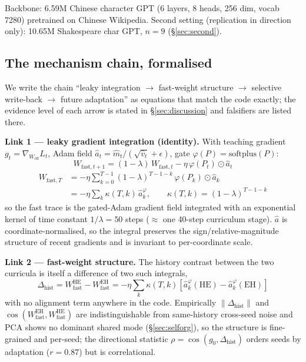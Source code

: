 \documentclass{article} %
\begin{document}
Backbone: 6.59M Chinese character GPT (6 layers, 8 heads, 256 dim, vocab 7280) pretrained on Chinese Wikipedia. Second setting (replication in direction only): 10.65M Shakespeare char GPT, $n{=}9$ (\S\ref{sec:second}).

\subsection{The mechanism chain, formalised}
\label{sec:chain}

We write the chain ``leaky integration $\to$ fast-weight structure $\to$ selective write-back $\to$ future adaptation'' as equations that match the code exactly; the evidence level of each arrow is stated in \S\ref{sec:discussion} and falsifiers are listed there.

\textbf{Link 1 --- leaky gradient integration (identity).} With teaching gradient $g_t = \nabla_{W_{\mathrm{eff}}} L_t$, Adam field $\hat{a}_t = \hat{m}_t/(\sqrt{\hat{v}_t}+\epsilon)$, gate $\varphi(P)=\mathrm{softplus}(P)$:
\begin{equation}
W_{\mathrm{fast},t+1} = (1-\lambda)\,W_{\mathrm{fast},t} - \eta\,\varphi(P_t)\odot \hat{a}_t
\end{equation}
\begin{equation}
\begin{aligned}
W_{\mathrm{fast},T} &= -\eta \sum_{k=0}^{T-1}(1-\lambda)^{T-1-k}\,\varphi(P_k)\odot \hat{a}_k \\
&= -\eta \sum_{k} \kappa(T,k)\,\hat{a}^{\varphi}_k,\qquad \kappa(T,k)=(1-\lambda)^{T-1-k}
\end{aligned}
\end{equation}
so the fast trace is the gated-Adam gradient field integrated with an exponential kernel of time constant $1/\lambda = 50$ steps ($\approx$ one 40-step curriculum stage). $\hat{a}$ is coordinate-normalised, so the integral preserves the sign/relative-magnitude structure of recent gradients and is invariant to per-coordinate scale.

\textbf{Link 2 --- fast-weight structure.} The history contrast between the two curricula is itself a difference of two such integrals,
\begin{equation}
\Delta_{\mathrm{hist}} = W_{\mathrm{fast}}^{\mathrm{HE}} - W_{\mathrm{fast}}^{\mathrm{EH}} = -\eta \sum_{k}\kappa(T,k)\left[\hat{a}^{\varphi}_k(\mathrm{HE}) - \hat{a}^{\varphi}_k(\mathrm{EH})\right]
\end{equation}
with no alignment term anywhere in the code. Empirically $\|\Delta_{\mathrm{hist}}\|$ and $\cos(W_{\mathrm{fast}}^{\mathrm{EH}}, W_{\mathrm{fast}}^{\mathrm{HE}})$ are indistinguishable from same-history cross-seed noise and PCA shows no dominant shared mode (\S\ref{sec:selforg}), so the structure is fine-grained and per-seed; the directional statistic $\rho = \cos(g_0, \Delta_{\mathrm{hist}})$ orders seeds by adaptation ($r{=}0.87$) but is correlational.
\end{document}
